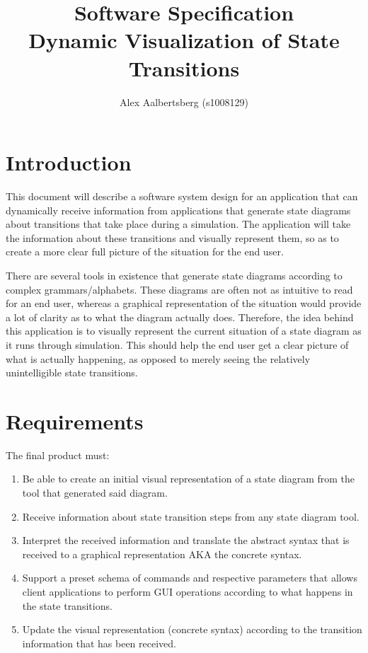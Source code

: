 \documentclass[12pt,a4paper]{article}
\begin{document}
\title{Software Specification \\ \vspace{2mm} {\large Dynamic Visualization of State Transitions}}
\author{Alex Aalbertsberg (s1008129)}
\maketitle

\clearpage
\tableofcontents

\clearpage
\section{Introduction}

This document will describe a software system design for an application that can dynamically receive information from applications that generate state diagrams about transitions that take place during a simulation. The application will take the information about these transitions and visually represent them, so as to create a more clear full picture of the situation for the end user.

There are several tools in existence that generate state diagrams according to complex grammars/alphabets. These diagrams are often not as intuitive to read for an end user, whereas a graphical representation of the situation would provide a lot of clarity as to what the diagram actually does. Therefore, the idea behind this application is to visually represent the current situation of a state diagram as it runs through simulation. This should help the end user get a clear picture of what is actually happening, as opposed to merely seeing the relatively unintelligible state transitions.

\clearpage
\section{Requirements}

The final product must:

\begin{enumerate}
	\item Be able to create an initial visual representation of a state diagram from the tool that generated said diagram.
	\item Receive information about state transition steps from any state diagram tool.
	\item Interpret the received information and translate the abstract syntax that is received to a graphical representation AKA the concrete syntax.
	\item Support a preset schema of commands and respective parameters that allows client applications to perform GUI operations according to what happens in the state transitions.
	\item Update the visual representation (concrete syntax) according to the transition information that has been received.
\end{enumerate}
\end{document}
